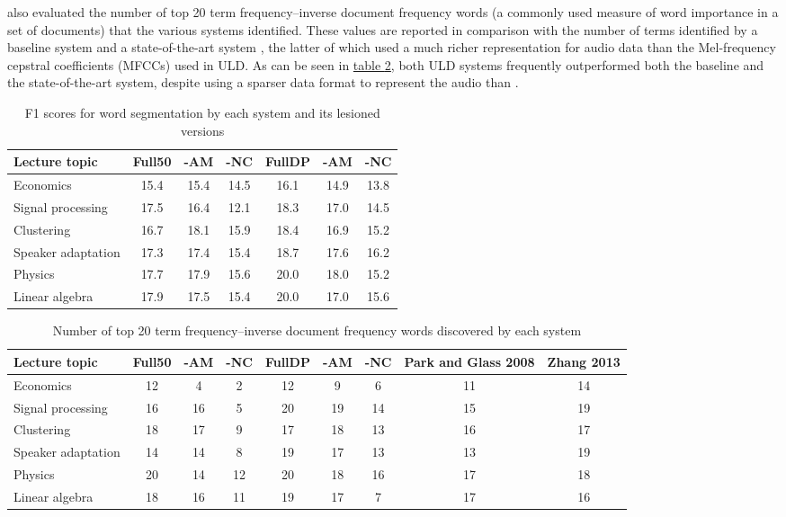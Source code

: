 \documentclass[12pt,letterpaper]{article}
\begin{document}
 \citet{lee:2015} also evaluated the number of top 20 term frequency–inverse document frequency words (a commonly used measure of word importance in a set of documents) that the various systems identified. These values are reported in comparison with the number of terms identified by a baseline system \citep{park:2008} and a state-of-the-art system \citep{zhang:2013}, the latter of which used a much richer representation for audio data than the Mel-frequency cepstral coefficients (MFCCs) used in ULD. As can be seen in  \hyperref[table3]{table \ref*{table3}}, both ULD systems frequently outperformed both the baseline and the state-of-the-art system, despite using a sparser data format to represent the audio than \citet{zhang:2013}. 


\begin{table}
\begin{tabular}{|l||c|c|c||c|c|c|}
\hline
Lecture topic&Full50&-AM&-NC&FullDP&-AM&-NC \\
\hline \hline
Economics&15.4&15.4&14.5&16.1&14.9&13.8\\
\hline
Signal processing&17.5&16.4&12.1&18.3&17.0&14.5\\
\hline
Clustering&16.7&18.1&15.9&18.4&16.9&15.2\\
\hline
Speaker adaptation&17.3&17.4&15.4&18.7&17.6&16.2\\
\hline
Physics&17.7&17.9&15.6&20.0&18.0&15.2\\
\hline
Linear algebra&17.9&17.5&15.4&20.0&17.0&15.6\\
\hline

\end{tabular}
\caption{F1 scores for word segmentation by each system and its lesioned versions}
\label{table2}
\end{table}

\begin{table}
\begin{tabular}{|l||c|c|c||c|c|c||c|c|}
\hline
Lecture topic&Full50&-AM&-NC&FullDP&-AM&-NC&Park and Glass 2008&Zhang 2013\\
\hline \hline
Economics&12&4&2&12&9&6&11&14\\
\hline
Signal processing&16&16&5&20&19&14&15&19\\
\hline
Clustering&18&17&9&17&18&13&16&17\\
\hline
Speaker adaptation&14&14&8&19&17&13&13&19\\
\hline
Physics&20&14&12&20&18&16&17&18\\
\hline
Linear algebra&18&16&11&19&17&7&17&16\\
\hline
\end{tabular}
\caption{Number of top 20 term frequency–inverse document frequency words discovered by each system}
\label{table3}
\end{table}
\end{document}
